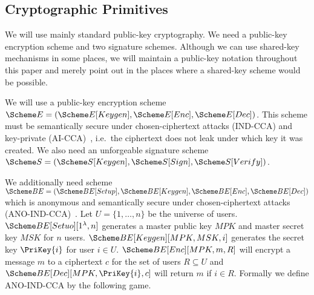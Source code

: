 \subsection{Cryptographic Primitives}
\label{CryptoPrimitives}

We will use mainly standard public-key cryptography.
We need a public-key encryption scheme and two signature schemes.
Although we can use shared-key mechanisms in some places, we will maintain 
a public-key notation throughout this paper and merely point out in the places 
where a shared-key scheme would be possible.

We will use a public-key encryption scheme \(\E = (\E[Keygen], \E[Enc], 
  \E[Dec])\).
This scheme must be semantically secure under chosen-ciphertext attacks 
(IND-CCA) and key-private (AI-CCA)~\cite{KeyPrivacy}, i.e.\ the ciphertext does 
not leak under which key it was created.
We also need an unforgeable signature scheme \(\S = (\S[Keygen], \S[Sign], 
  \S[Verify])\).

We additionally need  scheme \(\BE = (\BE[Setup],\allowbreak 
  \BE[Keygen],\allowbreak \BE[Enc],\allowbreak \BE[Dec])\) which is anonymous 
and semantically secure under chosen-ciphertext attacks 
(ANO-IND-CCA)~\cite{ANOBE}.
Let \(U = \{1, \ldots, n\}\) be the universe of users.
\(\BE[Setuo][1^\lambda, n]\) generates a master public key \(MPK\) and 
master secret key \(MSK\) for \(n\) users.
\(\BE[Keygen][MPK, MSK, i]\) generates the secret key \(\PriKey{i}\) for 
user \(i\in U\).
\(\BE[Enc][MPK, m, R]\) will encrypt a message \(m\) to a ciphertext \(c\) 
for the set of users \(R\subseteq U\) and \(\BE[Dec][MPK, \PriKey{i}, c]\) 
will return \(m\) if \(i\in R\).
Formally we define ANO-IND-CCA by the following game.

